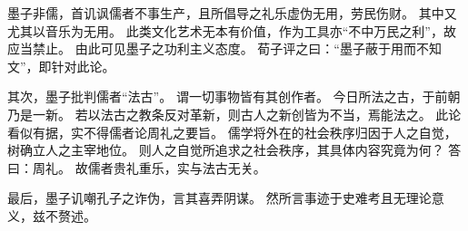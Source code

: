 \documentclass[11pt]{article}
\begin{document}
\par

墨子非儒，首讥讽儒者不事生产，且所倡导之礼乐虚伪无用，劳民伤财。
其中又尤其以音乐为无用。
此类文化艺术无本有价值，作为工具亦“不中万民之利”，故应当禁止。
由此可见墨子之功利主义态度。
荀子评之曰：“墨子蔽于用而不知文”，即针对此论。

\par

其次，墨子批判儒者“法古”。
谓一切事物皆有其创作者。
今日所法之古，于前朝乃是一新。
若以法古之教条反对革新，则古人之新创皆为不当，焉能法之。
此论看似有据，实不得儒者论周礼之要旨。
儒学将外在的社会秩序归因于人之自觉，树确立人之主宰地位。
则人之自觉所追求之社会秩序，其具体内容究竟为何？
答曰：周礼。
故儒者贵礼重乐，实与法古无关。

\par

最后，墨子讥嘲孔子之诈伪，言其喜弄阴谋。
然所言事迹于史难考且无理论意义，兹不赘述。
\end{document}
